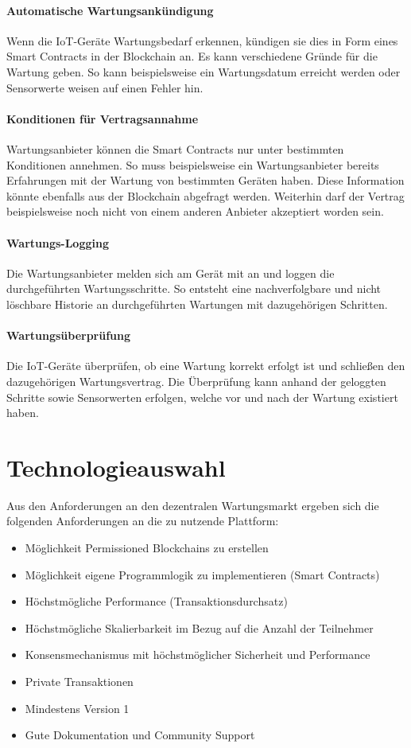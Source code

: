 \paragraph{Automatische Wartungsankündigung}
Wenn die IoT-Geräte Wartungsbedarf erkennen, kündigen sie dies in Form eines Smart Contracts in der Blockchain an. Es kann verschiedene Gründe für die Wartung geben. So kann beispielsweise ein Wartungsdatum erreicht werden oder Sensorwerte weisen auf einen Fehler hin.

\paragraph{Konditionen für Vertragsannahme}
Wartungsanbieter können die Smart Contracts nur unter bestimmten Konditionen annehmen. So muss beispielsweise ein Wartungsanbieter bereits Erfahrungen mit der Wartung von bestimmten Geräten haben. Diese Information könnte ebenfalls aus der Blockchain abgefragt werden. Weiterhin darf der Vertrag beispielsweise noch nicht von einem anderen Anbieter akzeptiert worden sein. 

\paragraph{Wartungs-Logging}
Die Wartungsanbieter melden sich am Gerät mit an und loggen die durchgeführten Wartungsschritte. So entsteht eine nachverfolgbare und nicht löschbare Historie an durchgeführten Wartungen mit dazugehörigen Schritten.

\paragraph{Wartungsüberprüfung}
Die IoT-Geräte überprüfen, ob eine Wartung korrekt erfolgt ist und schließen den dazugehörigen Wartungsvertrag. Die Überprüfung kann anhand der geloggten Schritte sowie Sensorwerten erfolgen, welche vor und nach der Wartung existiert haben.

\section{Technologieauswahl}
Aus den Anforderungen an den dezentralen Wartungsmarkt ergeben sich die folgenden Anforderungen an die zu nutzende Plattform: 

\begin{itemize}
    \item Möglichkeit Permissioned Blockchains zu erstellen
    \item Möglichkeit eigene Programmlogik zu implementieren (Smart Contracts)
    \item Höchstmögliche Performance (Transaktionsdurchsatz)
    \item Höchstmögliche Skalierbarkeit im Bezug auf die Anzahl der Teilnehmer
    \item Konsensmechanismus mit höchstmöglicher Sicherheit und Performance
    \item Private Transaktionen   
    \item Mindestens Version 1
    \item Gute Dokumentation und Community Support
\end{itemize}

